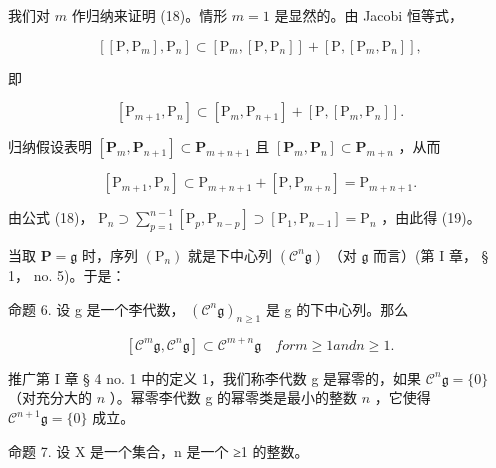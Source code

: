 我们对 \(m\) 作归纳来证明 (18)。情形 \(m = 1\) 是显然的。由 Jacobi 恒等式，

\[
[ [ \mathrm{P}, \mathrm{P} _ {m} ], \mathrm{P} _ {n} ] \subset [ \mathrm{P} _ {m}, [ \mathrm{P}, \mathrm{P} _ {n} ] ] + [ \mathrm{P}, [ \mathrm{P} _ {m}, \mathrm{P} _ {n} ] ],
\]

即

\[
[ \mathrm{P} _ {m + 1}, \mathrm{P} _ {n} ] \subset [ \mathrm{P} _ {m}, \mathrm{P} _ {n + 1} ] + [ \mathrm{P}, [ \mathrm{P} _ {m}, \mathrm{P} _ {n} ] ].
\]

归纳假设表明 \([\mathbf{P}_m, \mathbf{P}_{n+1}] \subset \mathbf{P}_{m+n+1}\) 且 \([\mathbf{P}_m, \mathbf{P}_n] \subset \mathbf{P}_{m+n}\) ，从而

\[
[ \mathrm{P} _ {m + 1}, \mathrm{P} _ {n} ] \subset \mathrm{P} _ {m + n + 1} + [ \mathrm{P}, \mathrm{P} _ {m + n} ] = \mathrm{P} _ {m + n + 1}.
\]

由公式 (18)， \(\mathrm{P}_n\supset \sum_{p = 1}^{n - 1}[\mathrm{P}_p,\mathrm{P}_{n - p}]\supset [\mathrm{P}_1,\mathrm{P}_{n - 1}] = \mathrm{P}_n\) ，由此得 (19)。

当取 \(\mathbf{P} = \mathfrak{g}\) 时，序列 \((\mathrm{P}_n)\) 就是下中心列 \((\mathcal{C}^n\mathfrak{g})\) （对 \(\mathfrak{g}\) 而言）(第 I 章， § 1， no. 5)。于是：

命题 6. 设 g 是一个李代数， \((\mathcal{C}^{n}\mathfrak{g})_{n\geqslant 1}\) 是 g 的下中心列。那么

\[
[ \mathcal {C} ^ {m} \mathfrak {g}, \mathcal {C} ^ {n} \mathfrak {g} ] \subset \mathcal {C} ^ {m + n} \mathfrak {g} \quad for m \geqslant 1 and n \geqslant 1.
\]

推广第 I 章 § 4 no. 1 中的定义 1，我们称李代数 g 是幂零的，如果 \(\mathcal{C}^{n}\mathfrak{g} = \{0\}\) （对充分大的 \(n\) ）。幂零李代数 g 的幂零类是最小的整数 \(n\) ，它使得 \(\mathcal{C}^{n + 1}\mathfrak{g} = \{0\}\) 成立。

命题 7. 设 X 是一个集合，n 是一个 ≥1 的整数。

